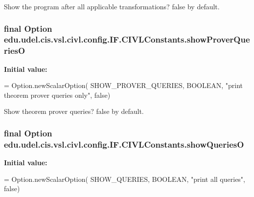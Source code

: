 Show the program after all applicable transformations? false by default. 

\hypertarget{classedu_1_1udel_1_1cis_1_1vsl_1_1civl_1_1config_1_1IF_1_1CIVLConstants_a41047684c4773025f807772e1e092ec1}{}
\subsubsection[{show\+Prover\+Queries\+O}]{\setlength{\rightskip}{0pt plus 5cm}final Option edu.\+udel.\+cis.\+vsl.\+civl.\+config.\+I\+F.\+C\+I\+V\+L\+Constants.\+show\+Prover\+Queries\+O\hspace{0.3cm}{\ttfamily [static]}}\label{classedu_1_1udel_1_1cis_1_1vsl_1_1civl_1_1config_1_1IF_1_1CIVLConstants_a41047684c4773025f807772e1e092ec1}
{\bfseries Initial value\+:}
\begin{DoxyCode}
= Option.newScalarOption(
            SHOW\_PROVER\_QUERIES, BOOLEAN, \textcolor{stringliteral}{"print theorem prover queries only"},
            \textcolor{keyword}{false})
\end{DoxyCode}


Show theorem prover queries? false by default. 

\hypertarget{classedu_1_1udel_1_1cis_1_1vsl_1_1civl_1_1config_1_1IF_1_1CIVLConstants_af4dcfade450026cfe265963cd1c3fcac}{}
\subsubsection[{show\+Queries\+O}]{\setlength{\rightskip}{0pt plus 5cm}final Option edu.\+udel.\+cis.\+vsl.\+civl.\+config.\+I\+F.\+C\+I\+V\+L\+Constants.\+show\+Queries\+O\hspace{0.3cm}{\ttfamily [static]}}\label{classedu_1_1udel_1_1cis_1_1vsl_1_1civl_1_1config_1_1IF_1_1CIVLConstants_af4dcfade450026cfe265963cd1c3fcac}
{\bfseries Initial value\+:}
\begin{DoxyCode}
= Option.newScalarOption(
            SHOW\_QUERIES, BOOLEAN, \textcolor{stringliteral}{"print all queries"}, \textcolor{keyword}{false})
\end{DoxyCode}


